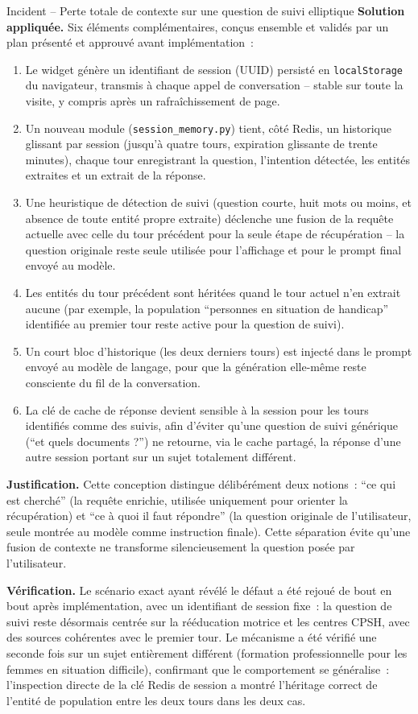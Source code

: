 \begin{probbox}{Incident -- Perte totale de contexte sur une question de suivi elliptique}
\textbf{Solution appliquée.} Six éléments complémentaires, conçus ensemble et validés par un plan présenté et approuvé avant implémentation~:
\begin{enumerate}
\item Le widget génère un identifiant de session (UUID) persisté en \texttt{localStorage} du navigateur, transmis à chaque appel de conversation -- stable sur toute la visite, y compris après un rafraîchissement de page.
\item Un nouveau module (\texttt{session\_memory.py}) tient, côté Redis, un historique glissant par session (jusqu'à quatre tours, expiration glissante de trente minutes), chaque tour enregistrant la question, l'intention détectée, les entités extraites et un extrait de la réponse.
\item Une heuristique de détection de suivi (question courte, huit mots ou moins, et absence de toute entité propre extraite) déclenche une fusion de la requête actuelle avec celle du tour précédent pour la seule étape de récupération -- la question originale reste seule utilisée pour l'affichage et pour le prompt final envoyé au modèle.
\item Les entités du tour précédent sont héritées quand le tour actuel n'en extrait aucune (par exemple, la population ``personnes en situation de handicap'' identifiée au premier tour reste active pour la question de suivi).
\item Un court bloc d'historique (les deux derniers tours) est injecté dans le prompt envoyé au modèle de langage, pour que la génération elle-même reste consciente du fil de la conversation.
\item La clé de cache de réponse devient sensible à la session pour les tours identifiés comme des suivis, afin d'éviter qu'une question de suivi générique (``et quels documents ?'') ne retourne, via le cache partagé, la réponse d'une autre session portant sur un sujet totalement différent.
\end{enumerate}

\textbf{Justification.} Cette conception distingue délibérément deux notions~: ``ce qui est cherché'' (la requête enrichie, utilisée uniquement pour orienter la récupération) et ``ce à quoi il faut répondre'' (la question originale de l'utilisateur, seule montrée au modèle comme instruction finale). Cette séparation évite qu'une fusion de contexte ne transforme silencieusement la question posée par l'utilisateur.

\textbf{Vérification.} Le scénario exact ayant révélé le défaut a été rejoué de bout en bout après implémentation, avec un identifiant de session fixe~: la question de suivi reste désormais centrée sur la rééducation motrice et les centres CPSH, avec des sources cohérentes avec le premier tour. Le mécanisme a été vérifié une seconde fois sur un sujet entièrement différent (formation professionnelle pour les femmes en situation difficile), confirmant que le comportement se généralise~: l'inspection directe de la clé Redis de session a montré l'héritage correct de l'entité de population entre les deux tours dans les deux cas.
\end{probbox}

